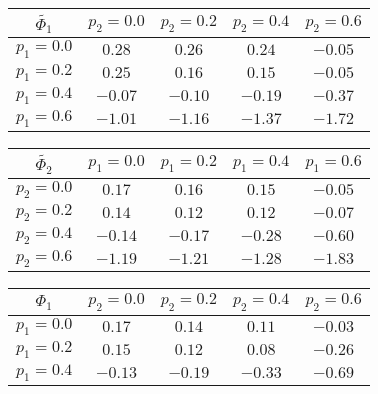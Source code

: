 \documentclass[USenglish,oneside,twocolumn]{article}
\theoremstyle{plain}
\begin{document}
\begin{appendices}
        \begin{table}[h]
            \centering
            \begin{tabular}{|c||c|c|c|c|}
                \hline
                $\widetilde{\Phi_1}$ & $p_2=0.0$ & $p_2=0.2$ & $p_2=0.4$ & $p_2=0.6$\\
                \hline
                \hline
                $p_1=0.0$ & $\num{0.28}$ & $\num{0.26}$ & $\num{0.24}$ & $\num{-0.05}$\\
                \hline
                $p_1=0.2$ & $\num{0.25}$ & $\num{0.16}$ & $\num{0.15}$ & $\num{-0.05}$\\
                \hline
                $p_1=0.4$ & $\num{-0.07}$ & $\num{-0.10}$ & $\num{-0.19}$ & $\num{-0.37}$\\
                \hline
                $p_1=0.6$ & $\num{-1.01}$ & $\num{-1.16}$ & $\num{-1.37}$ & $\num{-1.72}$\\
                \hline
            \end{tabular}
            \begin{tabular}{|c||c|c|c|c|}
                \hline
                $\widetilde{\Phi_2}$ & $p_1=0.0$ & $p_1=0.2$ & $p_1=0.4$ & $p_1=0.6$\\
                \hline
                \hline
                $p_2=0.0$ & $\num{0.17}$ & $\num{0.16}$ & $\num{0.15}$ & $\num{-0.05}$\\
                \hline
                $p_2=0.2$ & $\num{0.14}$ & $\num{0.12}$ & $\num{0.12}$ & $\num{-0.07}$\\
                \hline
                $p_2=0.4$ & $\num{-0.14}$ & $\num{-0.17}$ & $\num{-0.28}$ & $\num{-0.60}$\\
                \hline
                $p_2=0.6$ & $\num{-1.19}$ & $\num{-1.21}$ & $\num{-1.28}$ & $\num{-1.83}$\\
                \hline
            \end{tabular}
            \begin{tabular}{|c||c|c|c|c|}
                \hline
                $\Phi_1$ & $p_2=0.0$ & $p_2=0.2$ & $p_2=0.4$ & $p_2=0.6$\\
                \hline
                \hline
                $p_1=0.0$ & $\num{0.17}$ & $\num{0.14}$ & $\num{0.11}$ & $\num{-0.03}$\\
                \hline
                $p_1=0.2$ & $\num{0.15}$ & $\num{0.12}$ & $\num{0.08}$ & $\num{-0.26}$\\
                \hline
                $p_1=0.4$ & $\num{-0.13}$ & $\num{-0.19}$ & $\num{-0.33}$ & $\num{-0.69}$\\

\end{tabular}
\end{table}
\end{appendices}
\end{document}
